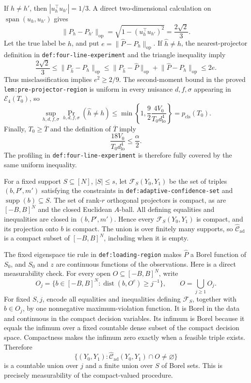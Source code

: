 If \(h\ne h'\), then \(|u_h^{\top}u_{h'}|=1/3\).  A direct two-dimensional calculation on \(\operatorname{span}(u_h,u_{h'})\) gives
\[
 \lVert P_h-P_{h'}\rVert_{\mathrm{op}}
 =\sqrt{1-(u_h^{\top}u_{h'})^2}
 =\frac{2\sqrt2}{3}.
\]
Let the true label be \(h\), and put \(e=\lVert\widehat P-P_h\rVert_{\mathrm{op}}\).  If \(\widehat h\ne h\), the nearest-projector definition in \texttt{def:four-line-experiment} and the triangle inequality imply
\[
 \frac{2\sqrt2}{3}
 \le\lVert P_{\widehat h}-P_h\rVert_{\mathrm{op}}
 \le\lVert P_{\widehat h}-\widehat P\rVert_{\mathrm{op}}
     +\lVert\widehat P-P_h\rVert_{\mathrm{op}}
 \le2e.
\]
Thus misclassification implies \(e^2\ge2/9\).  The second-moment bound in the proved \texttt{lem:pre-projector-region} is uniform in every nuisance \(d,f,\sigma\) appearing in \(\mathcal E_4(T_0)\), so
\[
 \sup_{h,d,f,\sigma}\Pr_{h,d,f,\sigma}(\widehat h\ne h)
 \le\min\left\{1,\frac{9}{2}\frac{4V_0}{T_0d_{\mathrm{lo}}^4}\right\}
 =p_{\mathrm{cls}}(T_0).
\]
Finally, \(T_0\ge\overline T\) and the definition of \(\overline T\) imply
\[
 \frac{18V_0}{T_0d_{\mathrm{lo}}^4}\le\frac\alpha2.
\]
The profiling in \texttt{def:four-line-experiment} is therefore fully covered by the same uniform inequality.

For a fixed support \(S\subseteq[N]\), \(|S|\le s\), let \(\mathcal F_S(Y_0,Y_1)\) be the set of triples \((b,P',m')\) satisfying the constraints in \texttt{def:adaptive-confidence-set} and \(\operatorname{supp}(b)\subseteq S\).  The set of rank-\(r\) orthogonal projectors is compact, as are \([-B,B]^N\) and the closed Euclidean \(A\)-ball.  All defining equalities and inequalities are closed in \((b,P',m')\).  Hence every \(\mathcal F_S(Y_0,Y_1)\) is compact, and its projection onto \(b\) is compact.  The union is over finitely many supports, so \(\widehat{\mathcal C}_{\mathrm{ad}}\) is a compact subset of \([-B,B]^N\), including when it is empty.

The fixed eigenspace tie rule in \texttt{def:loading-region} makes \(\widehat P\) a Borel function of \(S_0\), and \(S_0\) and \(z\) are continuous functions of the observations.  Here is a direct measurability check.  For every open \(O\subseteq[-B,B]^N\), write
\[
 O_j=\{b\in[-B,B]^N:\operatorname{dist}(b,O^c)\ge j^{-1}\},
 \qquad O=\bigcup_{j\ge1}O_j.
\]
For fixed \(S,j\), encode all equalities and inequalities defining \(\mathcal F_S\), together with \(b\in O_j\), by one nonnegative maximum-violation function.  It is Borel in the data and continuous in the compact decision variables.  Its infimum is Borel because it equals the infimum over a fixed countable dense subset of the compact decision space.  Compactness makes the infimum zero exactly when a feasible triple exists.  Therefore
\[
 \{(Y_0,Y_1):\widehat{\mathcal C}_{\mathrm{ad}}(Y_0,Y_1)\cap O\ne\varnothing\}
\]
is a countable union over \(j\) and a finite union over \(S\) of Borel sets.  This is precisely measurability of the compact-valued procedure.

